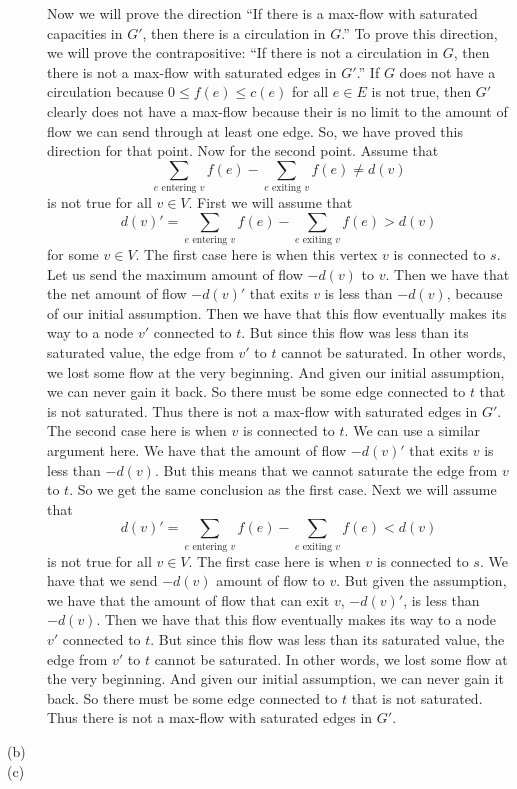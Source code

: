 \documentclass{article}
\begin{document}
\begin{description}
        Now we will prove the direction ``If there is a max-flow with saturated
        capacities in $G'$,  then there is a circulation in $G$.'' To prove this
        direction, we will prove the contrapositive: ``If there is not a
        circulation in $G$, then there is not a max-flow with saturated edges in
        $G'$.'' If $G$ does not have a circulation because $0 \le f(e) \le c(e)$
        for all $e \in E$ is not true, then $G'$ clearly does not have a
        max-flow because their is no limit to the amount of flow we can send
        through at least one edge. So, we have proved this direction for that
        point. Now for the second point. Assume that
        \[\sum_{e \mbox{ entering } v}f(e) - \sum_{e \mbox{ exiting } v}f(e)
        \neq d(v)\]
        is not true for all $v \in V$.
        First we will assume that
        \[d(v)' = \sum_{e \mbox{ entering } v}f(e) - \sum_{e \mbox{ exiting } v}f(e) > d(v)\]
        for some $v \in V$.
        The first case here is when this vertex $v$ is connected to $s$. Let us send
        the maximum amount of flow $-d(v)$ to $v$. Then we have that the net amount
        of flow $-d(v)'$ that exits $v$ is less than $-d(v)$, because of our initial
        assumption. Then we have that this flow eventually makes its way to a
        node $v'$ connected to $t$. But since this flow was less than its saturated
        value, the edge from $v'$ to $t$ cannot be saturated. In other words, we
        lost some flow at the very beginning. And given our initial assumption,
        we can never gain it back. So there must be some edge connected to $t$
        that is not saturated. Thus there is not a max-flow with saturated edges
        in $G'$. The second case here is when $v$ is connected to $t$. We can
        use a similar argument here. We have that the amount of flow $-d(v)'$
        that exits $v$ is less than $-d(v)$. But this means that we cannot
        saturate the edge from $v$ to $t$. So we get the same conclusion as the
        first case.
        Next we will assume that
        \[d(v)' = \sum_{e \mbox{ entering } v}f(e) - \sum_{e \mbox{ exiting } v}f(e) < d(v)\]
        is not true for all $v \in V$. The first case here is when $v$ is
        connected to $s$. We have that we send $-d(v)$ amount of flow to $v$.
        But given the assumption, we have that the amount of flow that can exit
        $v$, $-d(v)'$, is less than $-d(v)$. Then we have that this flow eventually makes its way to a
        node $v'$ connected to $t$. But since this flow was less than its saturated
        value, the edge from $v'$ to $t$ cannot be saturated. In other words, we
        lost some flow at the very beginning. And given our initial assumption,
        we can never gain it back. So there must be some edge connected to $t$
        that is not saturated. Thus there is not a max-flow with saturated edges
        in $G'$.
    \item[(b)]
    \item[(c)]
\end{description}
\newpage
\end{document}
